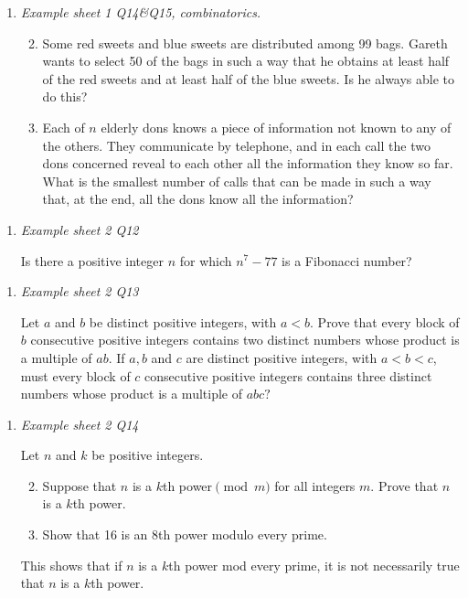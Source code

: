 \documentclass[11pt]{article}
\newlength{\qspace}
\newcounter{qnumber}
\newenvironment{question}%
 {\vspace{\qspace}
  \begin{enumerate}[\bfseries 1\quad][10]%
    \setcounter{enumi}{\value{qnumber}}%
    \item%
 }
{
  \end{enumerate}
  \filbreak
  \stepcounter{qnumber}
 }
\newenvironment{questionparts}[1][1]%
 {
  \begin{enumerate}[\bfseries (i)]%
    \setcounter{enumii}{#1}
    \addtocounter{enumii}{-1}
    \setlength{\parskip}{3pt}
 }
 {
  \end{enumerate}
 }
\begin{document}
\begin{question}\textit{Example sheet 1 Q14\&Q15, combinatorics.}

\begin{questionparts}
    \item Some red sweets and blue sweets are distributed among 99 bags. Gareth wants to select 50 of the bags in such a way that he obtains at least half of the red sweets and at least half of the blue sweets. Is he always able to do this?
    \item Each of $n$ elderly dons knows a piece of information not known to any of the others. They communicate by telephone, and in each call the two dons concerned reveal to each other all the information they know so far. What is the smallest number of calls that can be made in such a way that, at the end, all the dons know all the information?
\end{questionparts}
\end{question}

\begin{question}\textit{Example sheet 2 Q12}

  Is there a positive integer $n$ for which $n^7-77$ is a Fibonacci number?
\end{question}

\begin{question}\textit{Example sheet 2 Q13}
  
  Let $a$ and $b$ be distinct positive integers, with $a<b$. Prove that every block of $b$ consecutive positive integers contains two distinct numbers whose product is a multiple of $a b$. If $a, b$ and $c$ are distinct positive integers, with $a<b<c$, must every block of $c$ consecutive positive integers contains three distinct numbers whose product is a multiple of $a b c ?$
\end{question}

\begin{question}\textit{Example sheet 2 Q14}
  
  Let $n$ and $k$ be positive integers. 
  \begin{questionparts}
    \item Suppose that $n$ is a $k$th power$\pmod m$ for all integers $m$. Prove that $n$ is a $k$th power.
    \item Show that 16 is an 8th power modulo every prime.
  \end{questionparts}
  This shows that if $n$ is a $k$th power mod every prime, it is not necessarily true that $n$ is a $k$th power.
\end{question}
\end{document}
